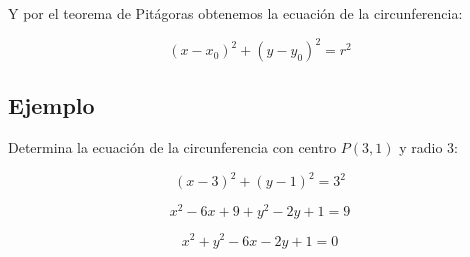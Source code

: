 \documentclass[a4paper,spanish,9pt]{extarticle}
\begin{document}
\begin{multicols*}{2}
Y por el teorema de Pitágoras obtenemos la ecuación de la circunferencia:

$$ (x-x_0)^2+(y-y_0)^2=r^2 $$

\subsection{Ejemplo}

Determina la ecuación de la circunferencia con centro $P(3,1)$ y radio 3:


$$(x-3)^2+(y-1)^2=3^2$$

$$x^2-6x+9+y^2-2y+1=9$$

$$x^2+y^2-6x-2y+1=0$$

\end{multicols*}
\end{document}
